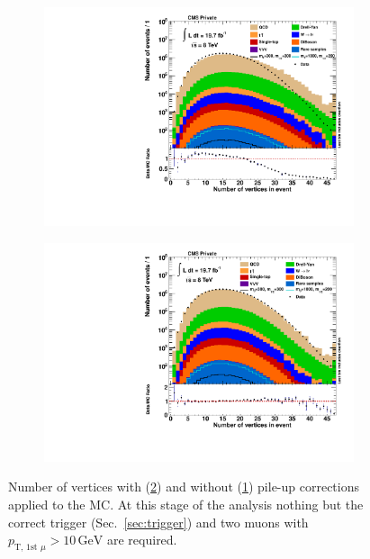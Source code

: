 {\begin{figure}[htb!]
  \centering
  \begin{subfigure}[b]{0.495\textwidth}
    \centering
    \includegraphics[width=\textwidth]{plots/vtx_n_nopu.pdf}
    \caption{\label{fig:vtx_n_nopu}}
  \end{subfigure}
  \begin{subfigure}[b]{0.495\textwidth}
    \centering
    \includegraphics[width=\textwidth]{plots/vtx_n.pdf}
    \caption{\label{fig:vtx_n}}
  \end{subfigure}
  \caption{Number of vertices with (\ref{fig:vtx_n}) and without (\ref{fig:vtx_n_nopu}) pile-up corrections applied to the MC. At this stage of the analysis nothing but the correct trigger (Sec.~\ref{sec:trigger}) and two muons with $p_{\text{T, 1st }\mu} > 10\,\text{GeV}$ are required.}
  \label{fig:vtxn}
\end{figure}

}

